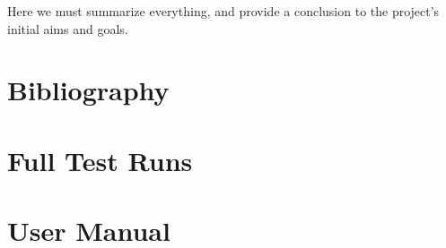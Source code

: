 \documentclass[11pt,a4paper]{article}
\begin{document}
Here we must summarize everything, and provide a conclusion to the project's
initial aims and goals.

\section{Bibliography}
\printbibliography

\appendix
\section{Full Test Runs}
\label{s:full-test-runs}

\section{User Manual}
\label{s:user-manual}

\end{document}
